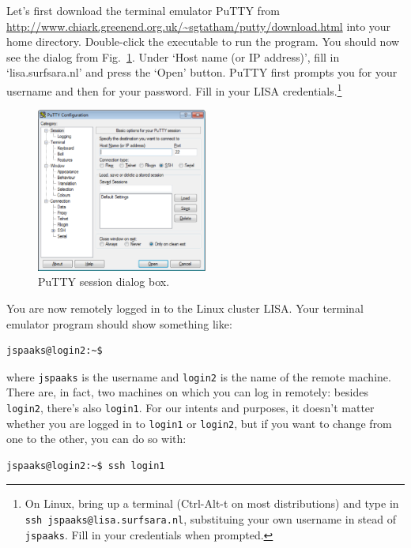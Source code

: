 %
Let's first download the terminal emulator PuTTY from \url{http://www.chiark.greenend.org.uk/~sgtatham/putty/download.html} into your home directory. Double-click the executable to run the program. You should now see the dialog from Fig.~\ref{fig:putty-session-dialog}. Under `Host name (or IP address)', fill in `lisa.surfsara.nl' and press the `Open' button. PuTTY first prompts you for your username and then for your password. Fill in your LISA credentials.\footnote{On Linux, bring up a terminal (Ctrl-Alt-t on most distributions) and type in \texttt{ssh jspaaks@lisa.surfsara.nl}, substituing your own username in stead of \texttt{jspaaks}. Fill in your credentials when prompted.}

\begin{figure}[htbp]
  \centering
    \includegraphics[width=0.5\textwidth]{./../eps/putty-session-dialog.eps}
  \caption{PuTTY session dialog box.}
  \label{fig:putty-session-dialog}
\end{figure}


You are now remotely logged in to the Linux cluster LISA. Your terminal emulator program should show something like:
\begin{lstlisting}[style=basic,style=bash]
jspaaks@login2:~$
\end{lstlisting}
where \texttt{jspaaks} is the username and \texttt{login2} is the name of the remote machine. There are, in fact, two machines on which you can log in remotely: besides \lstinline[style=bashinline]{login2}, there's also \lstinline[style=bashinline]{login1}. For our intents and purposes, it doesn't matter whether you are logged in to \lstinline[style=bashinline]{login1} or \lstinline[style=bashinline]{login2}, but if you want to change from one to the other, you can do so with:
\begin{lstlisting}[style=basic,style=bash]
jspaaks@login2:~$ ssh login1
\end{lstlisting}

